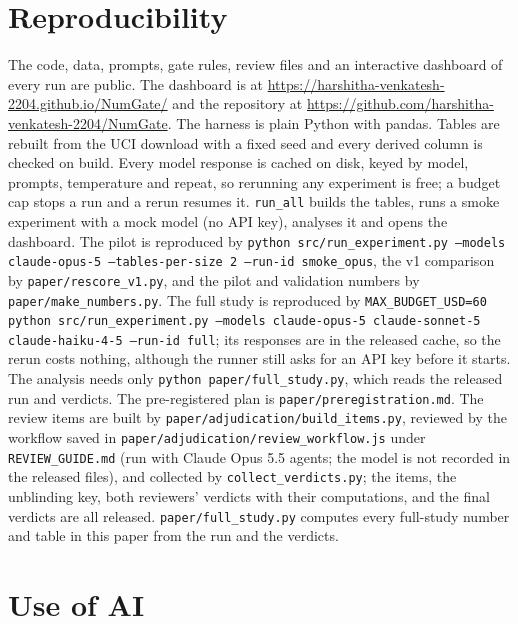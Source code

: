 \documentclass[11pt]{article}
\begin{document}
\section{Reproducibility}

The code, data, prompts, gate rules, review files and an interactive dashboard of every run are public. The dashboard is at \url{https://harshitha-venkatesh-2204.github.io/NumGate/} and the repository at \url{https://github.com/harshitha-venkatesh-2204/NumGate}. The harness is plain Python with pandas. Tables are rebuilt from the UCI download with a fixed seed and every derived column is checked on build. Every model response is cached on disk, keyed by model, prompts, temperature and repeat, so rerunning any experiment is free; a budget cap stops a run and a rerun resumes it. \texttt{run\_all} builds the tables, runs a smoke experiment with a mock model (no API key), analyses it and opens the dashboard. The pilot is reproduced by \texttt{python src/run\_experiment.py --models claude-opus-5 --tables-per-size 2 --run-id smoke\_opus}, the v1 comparison by \texttt{paper/rescore\_v1.py}, and the pilot and validation numbers by \texttt{paper/make\_numbers.py}. The full study is reproduced by \texttt{MAX\_BUDGET\_USD=60 python src/run\_experiment.py --models claude-opus-5 claude-sonnet-5 claude-haiku-4-5 --run-id full}; its responses are in the released cache, so the rerun costs nothing, although the runner still asks for an API key before it starts. The analysis needs only \texttt{python paper/full\_study.py}, which reads the released run and verdicts. The pre-registered plan is \texttt{paper/preregistration.md}. The review items are built by \texttt{paper/adjudication/build\_items.py}, reviewed by the workflow saved in \texttt{paper/adjudication/review\_workflow.js} under \texttt{REVIEW\_GUIDE.md} (run with Claude Opus 5.5 agents; the model is not recorded in the released files), and collected by \texttt{collect\_verdicts.py}; the items, the unblinding key, both reviewers' verdicts with their computations, and the final verdicts are all released. \texttt{paper/full\_study.py} computes every full-study number and table in this paper from the run and the verdicts.

\section*{Use of AI}
\end{document}
